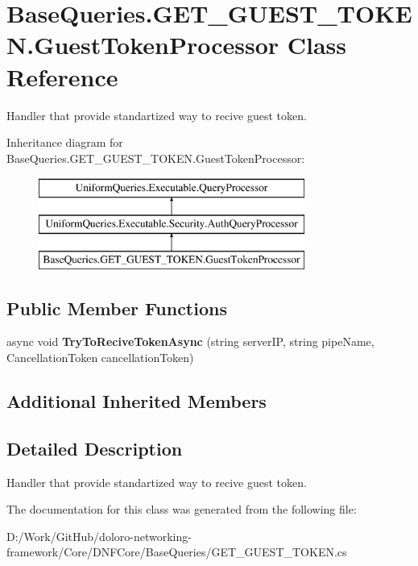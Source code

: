 \hypertarget{class_base_queries_1_1_g_e_t___g_u_e_s_t___t_o_k_e_n_1_1_guest_token_processor}{}\section{Base\+Queries.\+G\+E\+T\+\_\+\+G\+U\+E\+S\+T\+\_\+\+T\+O\+K\+E\+N.\+Guest\+Token\+Processor Class Reference}
\label{class_base_queries_1_1_g_e_t___g_u_e_s_t___t_o_k_e_n_1_1_guest_token_processor}


Handler that provide standartized way to recive guest token.  


Inheritance diagram for Base\+Queries.\+G\+E\+T\+\_\+\+G\+U\+E\+S\+T\+\_\+\+T\+O\+K\+E\+N.\+Guest\+Token\+Processor\+:\begin{figure}[H]
\begin{center}
\leavevmode
\includegraphics[height=3.000000cm]{d7/d42/class_base_queries_1_1_g_e_t___g_u_e_s_t___t_o_k_e_n_1_1_guest_token_processor}
\end{center}
\end{figure}
\subsection*{Public Member Functions}
\begin{DoxyCompactItemize}
\item 
\mbox{\label{class_base_queries_1_1_g_e_t___g_u_e_s_t___t_o_k_e_n_1_1_guest_token_processor_af9d9d6f5a3ca70f467099d6b8dac438b}} 
async void {\bfseries Try\+To\+Recive\+Token\+Async} (string server\+IP, string pipe\+Name, Cancellation\+Token cancellation\+Token)
\end{DoxyCompactItemize}
\subsection*{Additional Inherited Members}


\subsection{Detailed Description}
Handler that provide standartized way to recive guest token. 



The documentation for this class was generated from the following file\+:\begin{DoxyCompactItemize}
\item 
D\+:/\+Work/\+Git\+Hub/doloro-\/networking-\/framework/\+Core/\+D\+N\+F\+Core/\+Base\+Queries/G\+E\+T\+\_\+\+G\+U\+E\+S\+T\+\_\+\+T\+O\+K\+E\+N.\+cs\end{DoxyCompactItemize}
